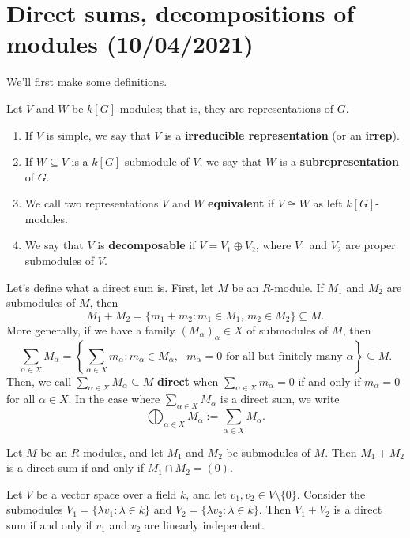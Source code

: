 \section{Direct sums, decompositions of modules (10/04/2021)}
We'll first make some definitions. 

\begin{defn}{} 
    Let $V$ and $W$ be $k[G]$-modules; that is, they are 
    representations of $G$. 
    \begin{enumerate}[(1)]
        \item If $V$ is simple, we say that $V$ is a {\bf irreducible representation}
        (or an {\bf irrep}).
        \item If $W \subseteq V$ is a $k[G]$-submodule of $V$, we say that $W$ is a 
        {\bf subrepresentation} of $G$. 
        \item We call two representations $V$ and $W$ {\bf equivalent} if 
        $V \cong W$ as left $k[G]$-modules. 
        \item We say that $V$ is {\bf decomposable} if $V = V_1 \oplus V_2$, 
        where $V_1$ and $V_2$ are proper submodules of $V$. 
    \end{enumerate}
\end{defn}

Let's define what a direct sum is. First, let $M$ be an $R$-module. 
If $M_1$ and $M_2$ are submodules of $M$, then 
\[ M_1 + M_2 = \{m_1 + m_2 : m_1 \in M_1,\, m_2 \in M_2\} \subseteq M. \] 
More generally, if we have a family $(M_\alpha)_\alpha \in X$ of submodules of 
$M$, then 
\[ \sum_{\alpha \in X} M_\alpha = \left\{ \sum_{\alpha \in X} m_\alpha : 
m_\alpha \in M_\alpha, \text{ $m_\alpha = 0$ for all but finitely many 
$\alpha$}\right\} \subseteq M. \] 
Then, we call $\sum_{\alpha \in X} M_\alpha \subseteq M$ 
{\bf direct} when $\sum_{\alpha \in X} m_\alpha = 0$ if and only if 
$m_\alpha = 0$ for all $\alpha \in X$. In the case where 
$\sum_{\alpha \in X} M_\alpha$ is a direct sum, we write 
\[ \bigoplus_{\alpha \in X} M_\alpha := \sum_{\alpha \in X} M_\alpha. \] 

\begin{remark}{}
    Let $M$ be an $R$-modules, and let $M_1$ and $M_2$ be submodules of $M$. 
    Then $M_1 + M_2$ is a direct sum if and only if $M_1 \cap M_2 = (0)$. 
\end{remark} 

\begin{exmp}{}
    Let $V$ be a vector space over a field $k$, and let $v_1, v_2 \in V 
    \setminus \{0\}$. Consider the submodules $V_1 = \{\lambda v_1 : \lambda 
    \in k\}$ and $V_2 = \{\lambda v_2 : \lambda \in k\}$. Then $V_1 + V_2$ is a 
    direct sum if and only if $v_1$ and $v_2$ are linearly independent. 
\end{exmp}

